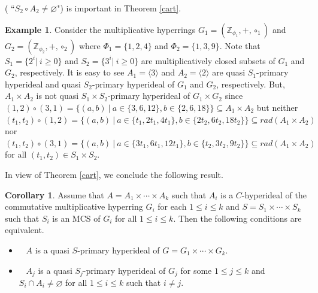 \documentclass[preprint,review,10pt]{amsart}
\theoremstyle{definition}
\newtheorem{example}[theorem]{Example}
\newtheorem{corollary}[theorem]{Corollary}
\theoremstyle{remark}
\numberwithin{equation}{section}
\begin{document}
( ``$S_2 \circ A_2 \neq \varnothing$")  is important in Theorem \ref{cart}.
\begin{example} \label{cart222}
Consider the multiplicative hyperrings $G_1=(\mathbb{Z}_{\phi_1},+,\circ_1)$ and $G_2=(\mathbb{Z}_{\phi_2},+,\circ_2)$ where $\Phi_1=\{1,2,4\}$ and $\Phi_2=\{1,3,9\}$. Note that $S_1=\{2^i \vert \ i\geq 0\}$ and $S_2=\{3^i \vert \ i \geq 0\}$ are multiplicatively closed subsets  of $G_1$ and $G_2$, respectively. It is easy to see  $A_1=\langle 3 \rangle$ and $A_2=\langle 2 \rangle$ are   quasi $S_1$-primary hyperideal and quasi $S_2$-primary hyperideal of $G_1 $ and $ G_2$, respectively.  But, $A_1 \times A_2$ is not   quasi $S_1 \times S_2$-primary hyperideal of $G_1 \times G_2$ since $(1,2) \circ (3,1)=\{(a,b) \ \vert \ a \in \{3,6,12\}, b \in \{2,6,18\}\} \subseteq A_1 \times A_2$ but neither $(t_1,t_2) \circ (1,2) =\{(a,b) \ \vert \ a \in \{ t_1,2t_1,4t_1\}, b \in \{2t_2,6t_2,18t_2\}\} \subseteq rad(A_1 \times A_2)$     nor  $(t_1,t_2) \circ (3,1) =\{(a,b) \ \vert \ a \in \{3 t_1,6t_1,12t_1\}, b \in \{ t_2,3t_2,9t_2\}\} \subseteq rad(A_1 \times A_2)$ for all $(t_1,t_2) \in S_1 \times S_2$.
\end{example}
In view of Theorem \ref{cart}, we conclude the following result.
\begin{corollary}
Assume that $A=A_1 \times \cdots \times A_k$ such that    $A_i$ is a $C$-hyperideal of the commutative multiplicative hyperring  $G_i$ for each $1 \leq i \leq k$  and $S=S_1 \times \cdots \times S_k$ such that  $S_i$ is  an MCS of $G_i$ for all $1 \leq i \leq k$. Then the following conditions are equivalent.
\begin{itemize}
\item[\rm{(i)}]~  $A$ is a quasi $S$-primary hyperideal of $G=G_1 \times \cdots \times  G_k$.
\item[\rm{(ii)}]~   $A_j$ is a quasi $S_j$-primary hyperideal of $G_j$ for some $1 \leq j \leq k$ and $S_i \cap A_i \neq \varnothing$ for all $1 \leq i \leq k$ such that $i \neq j$. 
\end{itemize}
\end{corollary}
\end{document}
